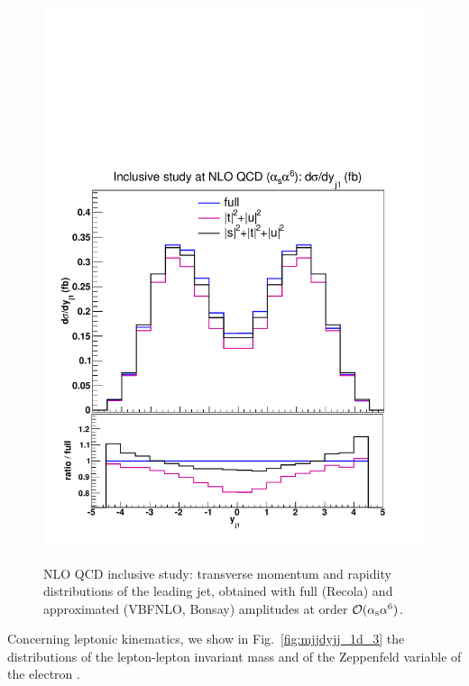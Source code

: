 \begin{figure}[hbt]
{\includegraphics[scale=0.35]{figures/scanfigures/yj1_nlo.pdf}}
\caption{NLO QCD inclusive study: transverse momentum and rapidity distributions of the leading jet, obtained with full ({\sc Recola}) and approximated ({\sc VBFNLO, Bonsay}) amplitudes at order $\mathcal{O}(\alpha_\text{s}\alpha^6)$.} \label{fig:mjjdyjj_1d_2}
\end{figure}

Concerning leptonic kinematics, we show in Fig.~\ref{fig:mjjdyjj_1d_3} the distributions of the lepton-lepton invariant mass and of the Zeppenfeld variable of the electron .


